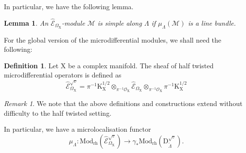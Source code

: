 \documentclass{article}
\theoremstyle{plain}
\newtheorem{lemma}[theorem]{Lemma}
\theoremstyle{definition}
\newtheorem{definition}[theorem]{Definition}
\theoremstyle{remark}
\newtheorem{remark}[theorem]{Remark}
\newcommand{\Em}{\widehat{\mathscr{E}}_{\Omega_\mr{X}}}
\newcommand{\mr}{\mathrm}
\newcommand{\3}{\vspace{3mm}}
\newcommand{\2}{\vspace{2mm}}
\newcommand{\1}{\vspace{1mm}}
\begin{document}
In particular, we have the following lemma.
\2
\begin{lemma}
An $\Em$-module $\mathscr{M}$ is simple along $\Lambda$ if $\mu_\Lambda(\mathscr{M})$ is a line bundle.
\end{lemma}
 For the global version of the microdifferential modules, we shall need the following:
 \2
 \begin{definition}
 Let $\mr{X}$ be a complex manifold. The sheaf of half twisted microdifferential operators is defined as $$\Em^{\sqrt{v}}=\pi^{-1}\mr{K}_\mr{X}^{1/2}\otimes_{\pi^{-1}\mathscr{O}_\mr{X}}\Em\otimes_{\pi^{-1}\mathscr{O}_\mr{X}}\pi^{-1}\mr{K}_\mr{X}^{1/2}$$
 \end{definition}
 \2
 \begin{remark}
 We note that the above definitions and constructions extend without difficulty to the half twisted setting.
 
 In particular, we have a microlocalisation functor $$\mu_\Lambda: \mr{Mod}_\mr{rh}\left(\Em^{\sqrt{v}}\right)\to \gamma_*\mr{Mod}_\mr{rh}\left(\mr{D}_{\widetilde{\Lambda}}^{\sqrt{v}}\right).$$
 \end{remark}
\end{document}
